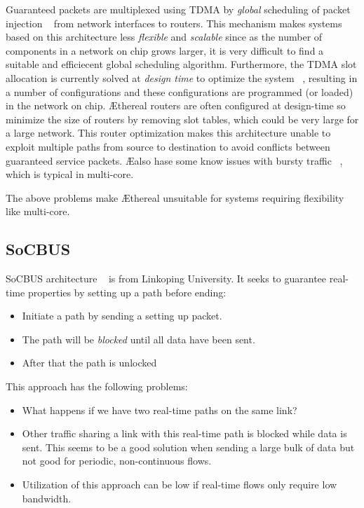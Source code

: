 \documentclass[conference, twocolumn]{IEEEtran}
\theoremstyle{definition}
\begin{document}
Guaranteed packets are multiplexed using TDMA by {\em global} scheduling of
packet injection ~\cite{Moonen07SPRINGER} from network interfaces to
routers. This mechanism makes systems based on this architecture less
{\em flexible} and {\em scalable} since as the number of components in a network
on chip grows larger, it is very difficult to find a suitable and efficiecent {global  scheduling} algorithm.
Furthermore, the TDMA slot allocation is currently solved at {\em design time}
to optimize the system ~\cite{Moonen07SPRINGER}, resulting in a number of
configurations and these configurations are programmed (or loaded) in the
network on chip. \AE thereal routers are often configured at design-time so
minimize the size of routers by removing slot tables, which could be very large
for a large network. This router optimization makes this architecture unable to
exploit multiple paths from source to destination to avoid conflicts between
guaranteed service packets. \AE also hase some know issues with bursty traffic
~\cite{Hansson07ISSS}, which is typical in multi-core.

The above problems make \AE thereal unsuitable for systems requiring
flexibility like multi-core.

\subsection{SoCBUS}
SoCBUS architecture ~\cite{SoCBUS} is from Linkoping University. It seeks to 
guarantee real-time properties by setting up a path before ending:
\begin{itemize}
\item Initiate a path by sending a setting up packet.
\item The path will be {\em blocked} until all data have been sent.
\item After that the path is unlocked
\end{itemize}
This approach has the following problems: 
\begin{itemize}
\item What happens if we have two real-time paths on the same link?
\item Other traffic sharing a link with this real-time path is blocked while 
data is sent. This seems to be a good solution when sending a large bulk of data 
but not good for periodic, non-continuous flows.
\item Utilization of this approach can be low if real-time flows only require
low bandwidth.
\end{itemize}
\end{document}
